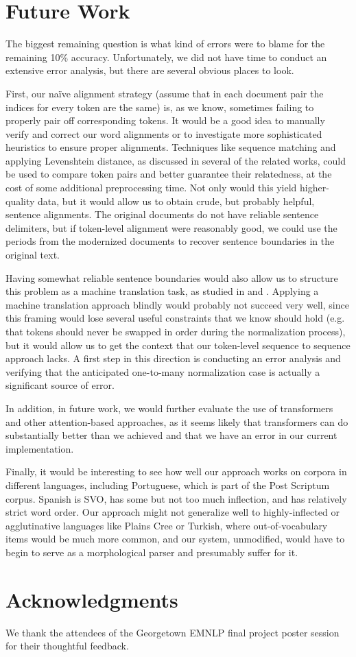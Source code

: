 \documentclass[11pt,a4paper]{article}
\begin{document}
\section{Future Work}
The biggest remaining question is what kind of errors were to blame for the remaining 10\% accuracy. Unfortunately, we did not have time to conduct an extensive error analysis, but there are several obvious places to look.

First, our na\"ive alignment strategy (assume that in each document pair the indices for every token are the same) is, as we know, sometimes failing to properly pair off corresponding tokens. It would be a good idea to manually verify and correct our word alignments or to investigate more sophisticated heuristics to ensure proper alignments. Techniques like sequence matching and applying Levenshtein distance, as discussed in several of the related works, could be used to compare token pairs and better guarantee their relatedness, at the cost of some additional preprocessing time. Not only would this yield higher-quality data, but it would allow us to obtain crude, but probably helpful, sentence alignments. The original documents do not have reliable sentence delimiters, but if token-level alignment were reasonably good, we could use the periods from the modernized documents to recover sentence boundaries in the original text. 

Having somewhat reliable sentence boundaries would also allow us to structure this problem as a machine translation task, as studied in \cite{robertson_evaluating_2018} and \cite{schneider_comparing_2017}. Applying a machine translation approach blindly would probably not succeed very well, since this framing would lose several useful constraints that we know should hold (e.g. that tokens should never be swapped in order during the normalization process), but it would allow us to get the context that our token-level sequence to sequence approach lacks. A first step in this direction is conducting an error analysis and verifying that the anticipated one-to-many normalization case is actually a significant source of error.

In addition, in future work, we would further evaluate the use of transformers and other attention-based approaches, as it seems likely that transformers can do substantially better than we achieved and that we have an error in our current implementation.

Finally, it would be interesting to see how well our approach works on corpora in different languages, including Portuguese, which is part of the Post Scriptum corpus. Spanish is SVO, has some but not too much inflection, and has relatively strict word order. Our approach might not generalize well to highly-inflected or agglutinative languages like Plains Cree or Turkish, where out-of-vocabulary items would be much more common, and our system, unmodified, would have to begin to serve as a morphological parser and presumably suffer for it.

\section*{Acknowledgments}
We thank the attendees of the Georgetown EMNLP final project poster session for their thoughtful feedback.



\end{document}
